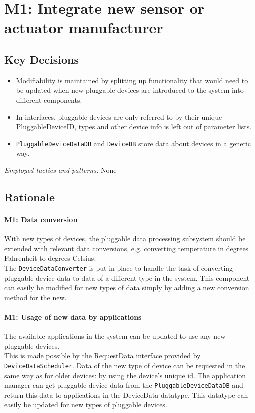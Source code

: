 \section{M1: Integrate new sensor or actuator manufacturer}

    \subsection*{Key Decisions}

    \begin{itemize}
    	\item Modifiability is maintained by splitting up functionality that would need to be updated
              when new pluggable devices are introduced to the system into different components.
        \item In interfaces, pluggable devices are only referred to by their unique PluggableDeviceID,
              types and other device info is left out of parameter lists.
        \item \texttt{PluggableDeviceDataDB} and \texttt{DeviceDB} store data about devices in
              a generic way.

    \end{itemize}
    \emph{Employed tactics and patterns:} None

    \subsection*{Rationale}
        \paragraph{M1: Data conversion}
            With new types of devices, the pluggable data processing subsystem
            should be extended with relevant data conversions,
            e.g. converting temperature in degrees Fahrenheit to degrees Celsius. \\
            The \texttt{DeviceDataConverter} is put in place to handle the
            task of converting pluggable device data to data of a different type in the system.
            This component can easily be modified for new types of data simply by
            adding a new conversion method for the new.

        \paragraph{M1: Usage of new data by applications}
            The available applications in the system can be updated to use any
            new pluggable devices. \\
            This is made possible by the RequestData
            interface provided by \texttt{DeviceDataScheduler}.
            Data of the new type of device can be requested in the same way
            as for older devices: by using the device's unique id.
            The application manager can get pluggable device data from the
            \texttt{PluggableDeviceDataDB} and return this data to applications in
            the DeviceData datatype. This datatype can easily be
            updated for new types of pluggable devices.

